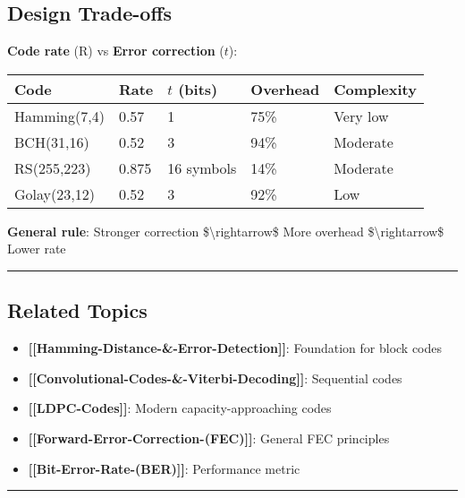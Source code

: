 \subsection{Design Trade-offs}\label{design-trade-offs}

\textbf{Code rate} (R) vs \textbf{Error correction} (\(t\)):

{\def\LTcaptype{} %
\begin{longtable}[]{@{}lllll@{}}
\toprule\noalign{}
Code & Rate & \(t\) (bits) & Overhead & Complexity \\
\midrule\noalign{}
\endhead
\bottomrule\noalign{}
\endlastfoot
Hamming(7,4) & 0.57 & 1 & 75\% & Very low \\
BCH(31,16) & 0.52 & 3 & 94\% & Moderate \\
RS(255,223) & 0.875 & 16 symbols & 14\% & Moderate \\
Golay(23,12) & 0.52 & 3 & 92\% & Low \\
\end{longtable}
}

\textbf{General rule}: Stronger correction \$\textbackslash rightarrow\$
More overhead \$\textbackslash rightarrow\$ Lower rate

\begin{center}\rule{0.5\linewidth}{0.5pt}\end{center}

\subsection{Related Topics}\label{related-topics}

\begin{itemize}
\tightlist
\item
  \textbf{{[}{[}Hamming-Distance-\&-Error-Detection{]}{]}}: Foundation
  for block codes
\item
  \textbf{{[}{[}Convolutional-Codes-\&-Viterbi-Decoding{]}{]}}:
  Sequential codes
\item
  \textbf{{[}{[}LDPC-Codes{]}{]}}: Modern capacity-approaching codes
\item
  \textbf{{[}{[}Forward-Error-Correction-(FEC){]}{]}}: General FEC
  principles
\item
  \textbf{{[}{[}Bit-Error-Rate-(BER){]}{]}}: Performance metric
\end{itemize}

\begin{center}\rule{0.5\linewidth}{0.5pt}\end{center}

